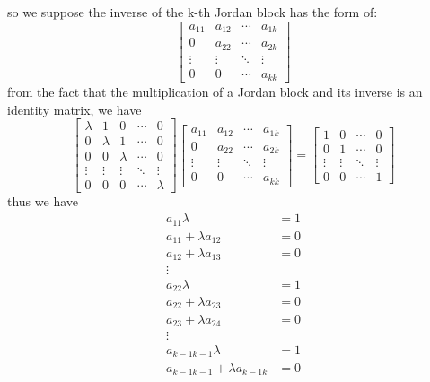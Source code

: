 \documentclass[12pt,a4paper]{article}
\begin{document}
so we suppose the inverse of the k-th Jordan block has the form of:
\[
    \begin{bmatrix}
        a_{11} & a_{12} & \cdots & a_{1k} \\
        0      & a_{22} & \cdots & a_{2k} \\
        \vdots & \vdots & \ddots & \vdots \\
        0      & 0      & \cdots & a_{kk}

    \end{bmatrix}
\]
from the fact that the multiplication of a Jordan block and its inverse is an identity matrix, we have
\[
    \begin{bmatrix}
        \lambda & 1      & 0      & \cdots & 0      \\
        0       & \lambda & 1      & \cdots & 0      \\
        0       & 0      & \lambda & \cdots & 0      \\
        \vdots  & \vdots & \vdots & \ddots & \vdots \\
        0       & 0      & 0      & \cdots & \lambda
    \end{bmatrix} \begin{bmatrix}
        a_{11} & a_{12} & \cdots & a_{1k} \\
        0      & a_{22} & \cdots & a_{2k} \\
        \vdots & \vdots & \ddots & \vdots \\
        0      & 0      & \cdots & a_{kk}
    \end{bmatrix} = \begin{bmatrix}
        1 & 0 & \cdots & 0 \\
        0 & 1 & \cdots & 0 \\
        \vdots & \vdots & \ddots & \vdots \\
        0 & 0 & \cdots & 1
    \end{bmatrix}
\]
thus we have
\[
    \begin{aligned}
        a_{11} \lambda & = 1 \\
        a_{11} + \lambda a_{12} & = 0 \\
        a_{12} + \lambda a_{13} & = 0 \\
        \vdots & \\
        a_{22} \lambda & = 1 \\
        a_{22} + \lambda a_{23} &= 0 \\
        a_{23} + \lambda a_{24} &= 0 \\
        \vdots & \\
        a_{k-1 k-1} \lambda & = 1 \\
        a_{k-1 k-1} + \lambda a_{k-1 k} &= 0 \\
    \end{aligned}
\]
\end{document}
